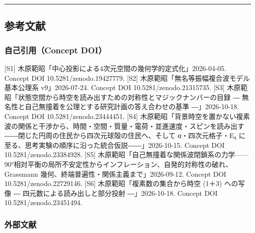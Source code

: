 \documentclass[
  a4paper,
]{ltjsarticle}
\begin{document}
\begin{center}\rule{0.5\linewidth}{0.5pt}\end{center}

\subsection{参考文献}\label{ux53c2ux8003ux6587ux732e}

\subsubsection{自己引用（Concept
DOI）}\label{ux81eaux5df1ux5f15ux7528concept-doi}

{[}S1{]} 木原範昭「中心投影による4次元空間の幾何学的定式化」2026-04-05.
Concept DOI 10.5281/zenodo.19427779. {[}S2{]}
木原範昭「無名等振幅複合波モデル基本公理系 v9」2026-07-24. Concept DOI
10.5281/zenodo.21315735. {[}S3{]}
木原範昭「状態空間から時空を読み出すための対称性とマジックナンバーの目録
― 無名性と自己無撞着を公理とする研究計画の答え合わせの基準
―」2026-10-18. Concept DOI 10.5281/zenodo.23444451. {[}S4{]}
木原範昭「背景時空を置かない複素波の関係と干渉から、時間・空間・質量・電荷・並進速度・スピンを読み出す――閉じた円周の住民から四次元球殻の住民へ、そして
α・四次元格子・E₈ に至る、思考実験の順序に沿った統合仮説――」2026-10-15.
Concept DOI 10.5281/zenodo.23384928. {[}S5{]}
木原範昭「自己無撞着な関係波閉鎖系の力学------90°相対平衡の局所不安定性からインフレーション、自発的対称性の破れ、Grassmann
幾何、終端普遍性・関係主義まで」2026-09-12. Concept DOI
10.5281/zenodo.22729146. {[}S6{]} 木原範昭「複素数の集合から時空 (1＋3)
への写像 ― 四元数による読み出しと部分投射 ―」2026-10-18. Concept DOI
10.5281/zenodo.23451494.

\subsubsection{外部文献}\label{ux5916ux90e8ux6587ux732e}
\end{document}
